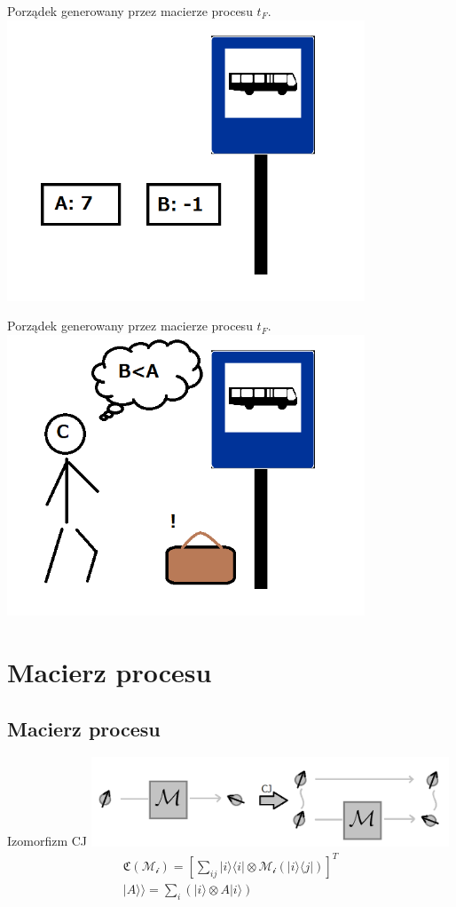 \documentclass{beamer}
\newcommand{\Ket}[1]{|#1\rangle}
\newcommand{\Bra}[1]{\langle#1|}
\newcommand{\KKet}[1]{|#1\rangle\rangle}
\begin{document}
\begin{frame}{Porządek generowany przez macierze procesu $t_F$.}
\centering
\includegraphics[width=0.8\textwidth]{obrazki/pF}
\end{frame}

\begin{frame}{Porządek generowany przez macierze procesu $t_F$.}
\centering
\includegraphics[width=0.8\textwidth]{obrazki/pC}
\end{frame}

\section{Macierz procesu}
\subsection{Macierz procesu}
\begin{frame}{Izomorfizm CJ}
\includegraphics[width=0.8\textwidth]{obrazki/cj_new}
\begin{gather}
\mathfrak{C}(\mathcal{M_i}) = \left[\sum_{ij} \Ket{i}\Bra{i} \otimes \mathcal{M_i}\left(\Ket{i}\Bra{j}\right)\right]^T\\
\KKet{A} = \sum_i \left( \Ket{i}\otimes A\Ket{i}\right)
\end{gather}
\end{frame}
\end{document}
